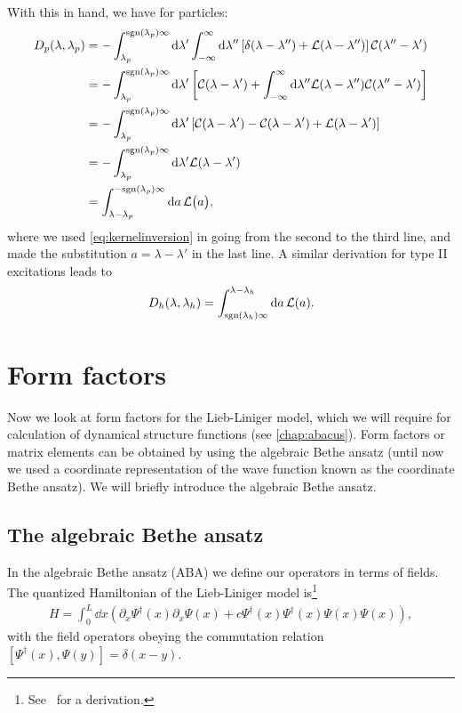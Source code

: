 \documentclass[11pt, a4paper]{report} %
\begin{document}
With this in hand, we have for particles:
\begin{align}
	D_p\qty(\lambda, \lambda_p) &= - \int_{\lambda_p}^{\textrm{sgn}\qty(\lambda_p)\infty} \dd \lambda' \int_{-\infty}^{\infty} \dd  \lambda'' \left[\delta\qty(\lambda-\lambda'') + \mathcal{L}\qty(\lambda-\lambda'') \right]\mathcal{C}\qty(\lambda''-\lambda')\\
	&= - \int_{\lambda_p}^{\textrm{sgn}\qty(\lambda_p)\infty} \dd \lambda' \left[\mathcal{C}\qty(\lambda-\lambda') + \int_{-\infty}^{\infty} \dd  \lambda'' \mathcal{L}\qty(\lambda-\lambda'') \mathcal{C}\qty(\lambda''-\lambda')\right]\\
	&= - \int_{\lambda_p}^{\textrm{sgn}\qty(\lambda_p)\infty} \dd \lambda' \left[\mathcal{C}\qty(\lambda-\lambda') - \mathcal{C}\qty(\lambda-\lambda') + \mathcal{L}\qty(\lambda-\lambda')\right]\\
	&= - \int_{\lambda_p}^{\textrm{sgn}\qty(\lambda_p)\infty} \dd \lambda' \mathcal{L}\qty(\lambda-\lambda')\\
	&=  \int_{\lambda-\lambda_p}^{-\textrm{sgn}\qty(\lambda_p)\infty} \dd a \, \mathcal{L}\qty\big(a),
\end{align}
where we used \cref{eq:kernelinversion} in going from the second to the third line, and made the substitution \(a = \lambda-\lambda'\) in the last line.
A similar derivation for type II excitations leads to
\begin{align}
	D_h\qty(\lambda,\lambda_h) = \int_{\textrm{sgn}(\lambda_h)\infty}^{\lambda-\lambda_h} \dd a\, \mathcal{L}(a).
\end{align}


\section{Form factors}
Now we look at form factors for the Lieb-Liniger model, which we will require for calculation of dynamical structure functions (see \cref{chap:abacus}).
Form factors or matrix elements can be obtained by using the algebraic Bethe ansatz (until now we used a coordinate representation of the wave function known as the coordinate Bethe ansatz).
We will briefly introduce the algebraic Bethe ansatz. 

\subsection{The algebraic Bethe ansatz}

In the algebraic Bethe ansatz (ABA) we define our operators in terms of fields.
The quantized Hamiltonian of the Lieb-Liniger model is\footnote{See~\cite{feynman} for a derivation.}
\begin{align}
  \label{eq:30}
  H = \int_0^L \dd x \left(\partial_x \Psi^{\dag}(x) \partial_x \Psi(x) + c \Psi^{\dag}(x)\Psi^{\dag}(x)\Psi(x)\Psi(x)\right),
\end{align}
with the field operators obeying the commutation relation \([\Psi^{\dag}(x),\Psi(y)] = \delta(x-y)\).
\end{document}
